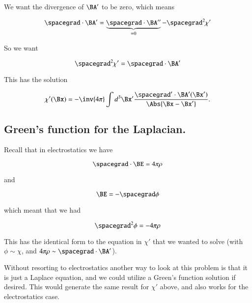 We want the divergence of $\BA'$ to be zero, which means

\begin{equation}\label{eqn:relativisticElectrodynamicsL14:210}
\spacegrad \cdot \BA' = \underbrace{\spacegrad \cdot \BA''}_{=0} - \spacegrad^2 \chi'
\end{equation}

So we want

\begin{equation}\label{eqn:relativisticElectrodynamicsL14:230}
\spacegrad^2 \chi' = \spacegrad \cdot \BA'
\end{equation}

This has the solution

\begin{equation}\label{eqn:relativisticElectrodynamicsL14:240}
\chi'(\Bx) = -\inv{4\pi} \int d^3 \Bx' \frac{\spacegrad' \cdot \BA'(\Bx')}{\Abs{\Bx - \Bx'}}.
\end{equation}

\subsection{Green's function for the Laplacian.}

Recall that in electrostatics we have

\begin{equation}\label{eqn:relativisticElectrodynamicsL14:250}
\spacegrad \cdot \BE = 4 \pi \rho
\end{equation}

and 

\begin{equation}\label{eqn:relativisticElectrodynamicsL14:270}
\BE = -\spacegrad \phi
\end{equation}

which meant that we had 

\begin{equation}\label{eqn:relativisticElectrodynamicsL14:290}
\spacegrad^2 \phi = -4 \pi \rho
\end{equation}

This has the identical form to the equation in $\chi'$ that we wanted to solve (with $\phi \sim \chi$, and $4 \pi \rho \sim \spacegrad \cdot \BA'$).

Without resorting to electrostatics another way to look at this problem is that it is just a Laplace equation, and we could utilize a Green's function solution if desired.  This would generate the same result for $\chi'$ above, and also works for the electrostatics case.

